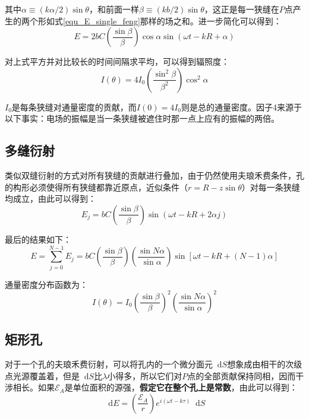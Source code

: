 \documentclass[UTF8]{ctexart}
\newcommand*{\dif}{\mathop{}\!\mathrm{d}}
\begin{document}
\noindent 其中$\alpha \equiv(k \alpha / 2) \sin \theta$，和前面一样$\beta \equiv(k b / 2) \sin \theta$，这正是每一狭缝在$ P $点产生的两个形如式\ref{equ_E_single_feng}那样的场之和。进一步简化可以得到：
\begin{equation}
E=2 b C\left(\frac{\sin \beta}{\beta}\right) \cos \alpha \sin (\omega t-k R+\alpha)
\end{equation}

\noindent 对上式平方并对比较长的时间间隔求平均，可以得到辐照度：
\begin{equation}
I(\theta)=4 I_{0}\left(\frac{\sin ^{2} \beta}{\beta^{2}}\right) \cos ^{2} \alpha
\end{equation}

\noindent $ I_{0} $是每条狭缝对通量密度的贡献，而$ I(0)=4 I_{0} $则是总的通量密度。因子4来源于以下事实：电场的振幅是当一条狭缝被遮住时那一点上应有的振幅的两倍。

	\subsection{多缝衍射}
	类似双缝衍射的方式对所有狭缝的贡献进行叠加，由于仍然使用夫琅禾费条件，孔的构形必须使得所有狭缝都靠近原点，近似条件（$ r=R-z \sin \theta $）对每一条狭缝均成立，由此可以得到：
	\begin{equation}
	E_{j}=b C\left(\frac{\sin \beta}{\beta}\right) \sin (\omega t-k R+2 \alpha j)
	\end{equation}
	
\noindent 最后的结果如下：
\begin{equation}
E=\sum_{j=0}^{N-1} E_{j}=b C\left(\frac{\sin \beta}{\beta}\right)\left(\frac{\sin N \alpha}{\sin \alpha}\right) \sin [\omega t-k R+(N-1) \alpha]
\end{equation}

\noindent 通量密度分布函数为：
\begin{equation}
I(\theta)=I_{0}\left(\frac{\sin \beta}{\beta}\right)^{2}\left(\frac{\sin N \alpha}{\sin \alpha}\right)^{2}
\end{equation}

	\subsection{矩形孔}
	对于一个孔的夫琅禾费衍射，可以将孔内的一个微分面元$ \dif S $想象成由相干的次级点光源覆盖着，但是$ \dif S $比$ \lambda $小得多，所以它们对$ P $点的全部贡献保持同相，因而干涉相长。如果$ \mathscr{E}_{A} $是单位面积的源强，\textbf{假定它在整个孔上是常数}，由此可以得到：
	\begin{equation}
	\dif E=\left(\frac{\mathscr{E}_{A}}{r}\right) e^{i(\omega t-k \tau)} \dif S
	\end{equation}
	
\end{document}
